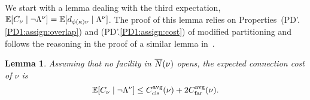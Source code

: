 \documentclass[oneside,final]{ucr}
\newtheorem{lemma}[theorem]{Lemma}
\begin{document}
We start with a lemma dealing with the third expectation,
$\mathbb{E}[C_\nu\mid\neg \Lambda^{\nu}] = \mathbb{E}[d_{\phi(\kappa)\nu} \mid
\Lambda^{\nu}]$. The proof of this lemma relies on
Properties~(PD'.\ref{PD1:assign:overlap}) and
(PD'.\ref{PD1:assign:cost}) of modified partitioning and follows the
reasoning in the proof of a similar lemma
in~\cite{ByrkaGS10,ByrkaA10}.


\begin{lemma}\label{lem: EBGS target connection cost}
Assuming that no facility in ${\overline{N}}(\nu)$ opens, the expected connection
cost of $\nu$ is
%
\begin{equation}
  \mathbb{E}[C_{\nu} \mid \neg \Lambda^{\nu}] \leq
  C_{{\mbox{\scriptsize\rm cls}}}^{{\mbox{\scriptsize\rm avg}}}(\nu) + 2C_{{\mbox{\scriptsize\rm far}}}^{{\mbox{\scriptsize\rm avg}}}(\nu).
  \label{eqn: expected connection cost target facility}
\end{equation}
%
\end{lemma}
\end{document}
